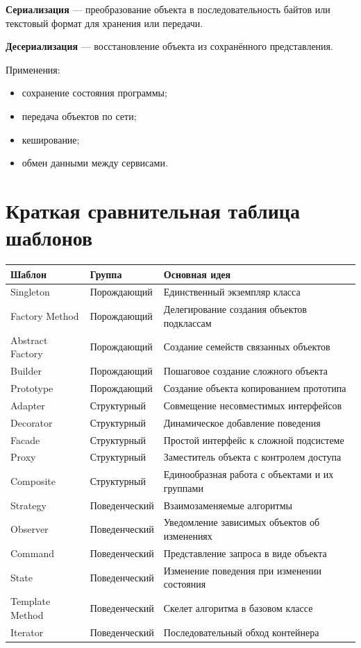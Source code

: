 \documentclass[12pt,a4paper]{article}
\begin{document}
\textbf{Сериализация} --- преобразование объекта в последовательность байтов или текстовый формат для хранения или передачи.

\textbf{Десериализация} --- восстановление объекта из сохранённого представления.

Применения:
\begin{itemize}
    \item сохранение состояния программы;
    \item передача объектов по сети;
    \item кеширование;
    \item обмен данными между сервисами.
\end{itemize}

\section{Краткая сравнительная таблица шаблонов}

\begin{longtable}{|p{4cm}|p{4cm}|p{6cm}|}
\hline
\textbf{Шаблон} & \textbf{Группа} & \textbf{Основная идея} \\
\hline
Singleton & Порождающий & Единственный экземпляр класса \\
\hline
Factory Method & Порождающий & Делегирование создания объектов подклассам \\
\hline
Abstract Factory & Порождающий & Создание семейств связанных объектов \\
\hline
Builder & Порождающий & Пошаговое создание сложного объекта \\
\hline
Prototype & Порождающий & Создание объекта копированием прототипа \\
\hline
Adapter & Структурный & Совмещение несовместимых интерфейсов \\
\hline
Decorator & Структурный & Динамическое добавление поведения \\
\hline
Facade & Структурный & Простой интерфейс к сложной подсистеме \\
\hline
Proxy & Структурный & Заместитель объекта с контролем доступа \\
\hline
Composite & Структурный & Единообразная работа с объектами и их группами \\
\hline
Strategy & Поведенческий & Взаимозаменяемые алгоритмы \\
\hline
Observer & Поведенческий & Уведомление зависимых объектов об изменениях \\
\hline
Command & Поведенческий & Представление запроса в виде объекта \\
\hline
State & Поведенческий & Изменение поведения при изменении состояния \\
\hline
Template Method & Поведенческий & Скелет алгоритма в базовом классе \\
\hline
Iterator & Поведенческий & Последовательный обход контейнера \\
\hline
\end{longtable}
\end{document}
